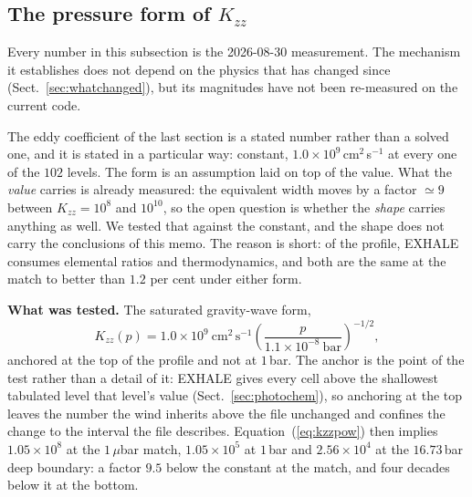 \documentclass[english,a4paper]{my_memo}
\begin{document}
\subsection{The pressure form of $K_{zz}$}
\label{sec:kzzform}

Every number in this subsection is the 2026-08-30 measurement. The mechanism
it establishes does not depend on the physics that has changed since
(Sect.~\ref{sec:whatchanged}), but its magnitudes have not been re-measured
on the current code.

The eddy coefficient of the last section is a stated number rather than a
solved one, and it is stated in a particular way: constant,
$1.0\times10^{9}$\,cm$^2$\,s$^{-1}$ at every one of the $102$ levels. The
form is an assumption laid on top of the value. What the \emph{value} carries
is already measured: the equivalent width moves by a factor $\simeq 9$
between $K_{zz} = 10^{8}$ and $10^{10}$, so the open question is whether the
\emph{shape} carries anything as well. We tested that against the constant,
and the shape does not carry the conclusions of this memo. The reason is
short: of the profile, EXHALE consumes elemental ratios and thermodynamics,
and both are the same at the match to better than $1.2$ per cent under either
form.

\medskip
\noindent\textbf{What was tested.} The saturated gravity-wave form,
%
\begin{equation}
  K_{zz}(p) = 1.0\times10^{9}\ \mathrm{cm^2\,s^{-1}}
  \left(\frac{p}{1.1\times10^{-8}\ \mathrm{bar}}\right)^{-1/2},
  \label{eq:kzzpow}
\end{equation}
%
anchored at the top of the profile and not at $1$\,bar. The anchor is the
point of the test rather than a detail of it: EXHALE gives every cell above
the shallowest tabulated level that level's value
(Sect.~\ref{sec:photochem}), so anchoring at the top leaves the number the
wind inherits above the file unchanged and confines the change to the
interval the file describes. Equation~(\ref{eq:kzzpow}) then implies
$1.05\times10^{8}$ at the $1\,\mu$bar match, $1.05\times10^{5}$ at $1$\,bar
and $2.56\times10^{4}$ at the $16.73$\,bar deep boundary: a factor $9.5$
below the constant at the match, and four decades below it at the bottom.
\end{document}
